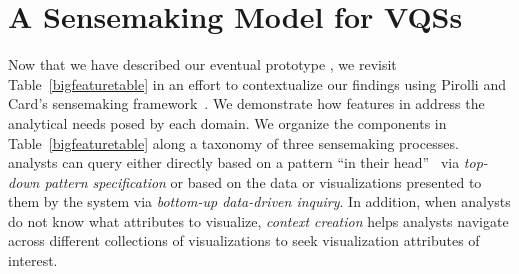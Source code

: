  \section{A Sensemaking Model for VQSs\label{sec:sensemaking}}
 Now that we have described our eventual prototype \zvpp, we revisit Table~\ref{bigfeaturetable} in an effort to contextualize our findings using Pirolli and Card's sensemaking framework~\cite{Pirolli}. We demonstrate how features in \zvpp address the analytical needs posed by each domain. We organize the components in Table~\ref{bigfeaturetable} along a taxonomy of three sensemaking processes. %
  analysts can query either directly based on a pattern ``in their head''~\cite{Sedlmair2012} via \emph{top-down pattern specification} or based on the data or visualizations presented to them by the system via \emph{bottom-up data-driven inquiry}. In addition, when analysts do not know what attributes to visualize, \emph{context creation} helps analysts navigate across different collections of visualizations to seek visualization attributes of interest. 
